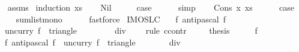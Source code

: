 \begin{isabellebody}
%
\isadelimproof
\ \ %
\endisadelimproof
%
\isatagproof
{}\isamarkupfalse%
\ assms\isanewline
{}\isamarkupfalse%
\ {\isacharparenleft}induction\ xs{\isacharparenright}\isanewline
\ \ \isamarkupfalse%
\ Nil\isanewline
\ \ \isamarkupfalse%
\ \isamarkupfalse%
\ {\isacharquery}case\isanewline
\ \ \ \ \isamarkupfalse%
\ simp\isanewline
{}\isamarkupfalse%
\isanewline
\ \ \isamarkupfalse%
\ {\isacharparenleft}Cons\ x\ xs{\isacharparenright}\ \ \isanewline
\ \ \isamarkupfalse%
\ {\isacharquery}case\isanewline
\ \ \ \ \isamarkupfalse%
\ sum{\isacharunderscore}list{\isacharunderscore}mono\isanewline
\ \ \ \ \isamarkupfalse%
\ fastforce\isanewline
{}\isamarkupfalse%
%
\endisatagproof
{\isafoldproof}%
%
\isadelimproof
\isanewline
%
\endisadelimproof
\isanewline
{}\isamarkupfalse%
\ IMO{}{}{}{}SL{\isacharunderscore}C{}{\isacharcolon}\isanewline
\ \ {\isachardoublequoteopen}{\isasymnexists}\ f{\isachardot}\ antipascal\ f\ {}{}{}{}\ {\isasymand}\ \isanewline
\ \ \ {\isacharparenleft}uncurry\ f{\isacharparenright}\ {\isacharbackquote}\ triangle\ {}\ {}\ {}{}{}{}\ \ {\isacharequal}\ {\isacharbraceleft}{}{\isachardot}{\isachardot}{\isacharless}{}{}{}{}{\isacharasterisk}{\isacharparenleft}{}{}{}{}\ {\isacharplus}\ {}{\isacharparenright}\ div\ {}\ {\isacharplus}\ {}{\isacharbraceright}{\isachardoublequoteclose}\isanewline
%
\isadelimproof
%
\endisadelimproof
%
\isatagproof
{}\isamarkupfalse%
\ {\isacharparenleft}rule\ ccontr{\isacharparenright}\isanewline
\ \ \isamarkupfalse%
\ {\isachardoublequoteopen}{\isasymnot}\ {\isacharquery}thesis{\isachardoublequoteclose}\isanewline
\ \ \isamarkupfalse%
\ \isamarkupfalse%
\ f\ \isanewline
\ \ \ f{\isacharcolon}\ {\isachardoublequoteopen}antipascal\ f\ {}{}{}{}{\isachardoublequoteclose}\ {\isachardoublequoteopen}{\isacharparenleft}uncurry\ f{\isacharparenright}\ {\isacharbackquote}\ triangle\ {}\ {}\ {}{}{}{}\ {\isacharequal}\ {\isacharbraceleft}{}{\isachardot}{\isachardot}{\isacharless}{}{}{}{}{\isacharasterisk}{\isacharparenleft}{}{}{}{}\ {\isacharplus}\ {}{\isacharparenright}\ div\ {}{\isacharplus}{}{\isacharbraceright}{\isachardoublequoteclose}\isanewline

\end{isabellebody}
